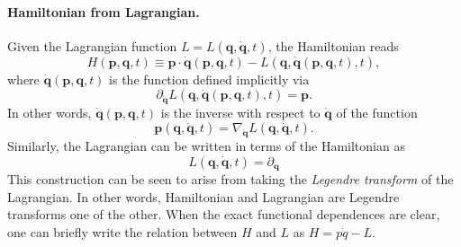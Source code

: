 \documentclass[12pt]{report}
\newcommand{\bs}[1]{\boldsymbol{#1}}
\begin{document}
\paragraph{Hamiltonian from Lagrangian.}
Given the Lagrangian function $L=L(\bs q,\dot{\bs q},t)$, the Hamiltonian reads
\begin{equation}
	H(\bs p, \bs q, t) \equiv
	\bs p\cdot\dot{\bs q}(\bs p, \bs q, t)
	- L(\bs q, \dot{\bs q}(\bs p, \bs q, t), t),
\end{equation}
where $\dot{\bs q}(\bs p, \bs q, t)$ is the function defined implicitly via
\begin{equation}
	\partial_{\dot{\bs q}}L(\bs q, \dot{\bs q}(\bs p, \bs q, t), t)
	= \bs p.
\end{equation}
In other words, $\dot{\bs q}(\bs p,\bs q, t)$ is the inverse with respect to $\dot{\bs q}$ of the function
\begin{equation}
	\bs p(\bs q,\dot{\bs q}, t) = \nabla_{\dot{\bs q}}L(\bs q, \dot{\bs q}, t).
\end{equation}
Similarly, the Lagrangian can be written in terms of the Hamiltonian as
\begin{equation}
	L(\bs q,\dot{\bs q}, t) =
	\partial_{\dot{\bs q}}
\end{equation}
This construction can be seen to arise from taking the \emph{Legendre transform} of the Lagrangian. In other words, Hamiltonian and Lagrangian are Legendre transforms one of the other.
When the exact functional dependences are clear, one can briefly write the relation between $H$ and $L$ as $H=p\dot q - L$.
\end{document}
